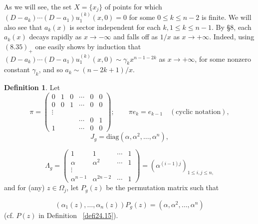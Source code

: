 \documentclass{surv-l}
\theoremstyle{plain}
\theoremstyle{definition}
\newtheorem{definition}[theorem]{Definition}
\numberwithin{equation}{chapter}
\begin{document}
As we will see, the set $X = \{x_{j}\}$ of points for which $(D-a_{k})\cdots(D-a_{1})u_{1}^{(k)}(x, 0)=0$ for some $0\leq k\leq n-2$ is finite. We will also see that $a_{k}(x)$ is sector independent for each $k, 1\leq k\leq n-1$. By \S 8, each $a_{k}(x)$ decays rapidly as $ x\rightarrow-\infty$ and falls off as $1/x$ as $ x\rightarrow+\infty$. Indeed, using $(8.35)_{+}$ one easily shows by induction that $(D-a_{k})\cdots(D-a_{1})u_{1}^{(k)}(x,0)\sim\gamma_{k}x^{n-1-2k}$ as  $x\rightarrow+\infty$, for some nonzero constant $\gamma_{k}$, and so $a_{k}\sim(n-2k+1)/x$.
\setcounter{theorem}{21}
\begin{definition}\label{defi38.22}
Let
\setcounter{equation}{22}
\begin{equation}\label{eq38.23}
\pi=\left(\begin{array}{llllll}
0 & 1 & 0 & \cdots & 0 & 0\\
0 & 0 & 1 & \cdots & 0 & 0\\
\vdots & & & & &\\
  &  &  & \cdots & 0 & 1\\
1 &  & & \cdots & 0 & 0
\end{array}\right); \qquad  \pi e_{k}=e_{k-1}\quad (\text{cyclic notation}),
\end{equation}
\begin{equation}\label{eq38.24}
J_{g}=\mathrm{diag}(\alpha,\alpha^{2},\ldots,\alpha^{n}),
\end{equation}

\begin{equation}\label{eq38.25}
\Lambda_{g}=\left(\begin{array}{cccc}
1 & 1 & \cdots   &1  \\
\alpha & \alpha^{2} & \cdots &1\\
\vdots &  &  & \\
\alpha^{n-1} & \alpha^{2n-2} &\cdots  &1
\end{array}\right) =(\alpha^{(i-1)j})_{1\leq i,j\leq n,}
\end{equation}
and for (any) $z\in\Omega_{j}$, let $P_{g}(z)$ be the permutation matrix such that
\end{definition}
\begin{equation}\label{eq38.26}
(\alpha_{1}(z),\ldots,\alpha_{n}(z))P_{g}(z)=(\alpha, \alpha^{2},\ldots,\alpha^{n})
\end{equation}
(cf. $P(z)$ in Definition ~\ref{defi24.15}).
\end{document}

